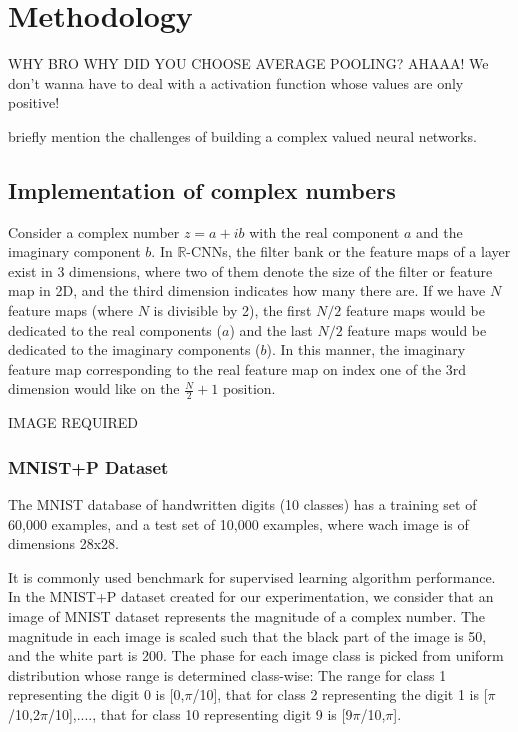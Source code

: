 \chapter{Methodology} \label{chap:methodology}
 
 WHY BRO WHY DID YOU CHOOSE AVERAGE POOLING?
 AHAAA!  We don't wanna have to deal with a activation function whose values are only positive!
 
 briefly mention the challenges of building a complex valued neural networks. 
 
 \section{Implementation of complex numbers}
 Consider a complex number $z=a+ib$ with the real component $a$ and the imaginary component $b$. In $\mathbb{R}$-CNNs, the filter bank or the feature maps of a layer exist in 3 dimensions, where two of them denote the size of the filter or feature map in 2D, and the third dimension indicates how many there are. If we have $N$ feature maps (where $N$ is divisible by 2), the first $N/2$ feature maps would be dedicated to the real components ($a$) and the last $N/2$ feature maps would be dedicated to the imaginary components ($b$). In this manner, the imaginary feature map corresponding to the real feature map on index one of the 3rd dimension would like on the $\frac{N}{2} +1$ position.
 
 IMAGE REQUIRED
 
 \subsection{MNIST+P Dataset}
 The MNIST database of handwritten digits (10 classes) has a training set of 60,000 examples, and a test set of 10,000 examples, where wach image is of dimensions 28x28. 
 
 
 It is commonly used benchmark for supervised learning algorithm performance. In the MNIST+P dataset created for our experimentation, we consider that an image of MNIST dataset represents the magnitude of a complex number. The magnitude in each image is scaled such that the black part of the image is 50, and the white part is 200. The phase for each image class is picked from uniform distribution whose range is determined class-wise: The range for class 1 representing the digit 0 is [0,$\pi$/10], that for class 2 representing the digit 1 is [$\pi$/10,2$\pi$/10],...., that for class 10 representing digit 9 is [9$\pi$/10,$\pi$]. 
 
